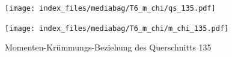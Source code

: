 \documentclass[
  11pt,
  letterpaper,
]{scrreprt}
\begin{document}
\begin{figure}[H]

\begin{minipage}{0.50\linewidth}
\texttt{[image: index\_files/mediabag/T6\_m\_chi/qs\_135.pdf]}\end{minipage}%
%
\begin{minipage}{0.50\linewidth}
\texttt{[image: index\_files/mediabag/T6\_m\_chi/m\_chi\_135.pdf]}\end{minipage}%

\caption{\label{fig-m_chi_appendix}Momenten-Krümmungs-Beziehung des
Querschnitts 135}

\end{figure}%
\end{document}
